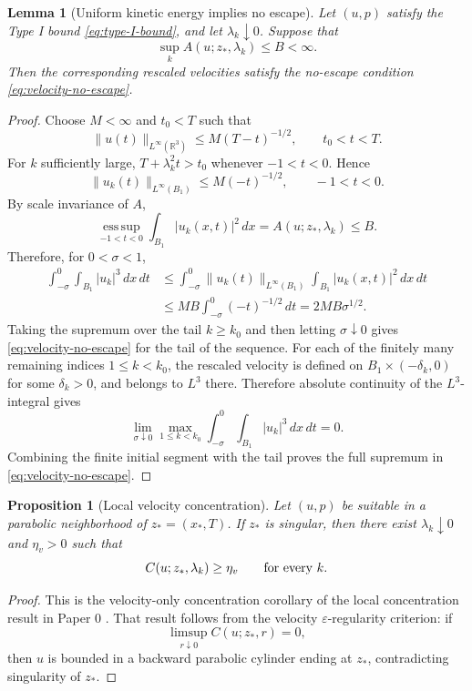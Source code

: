 \documentclass[11pt]{amsart}
\theoremstyle{plain}
\newtheorem{proposition}[theorem]{Proposition}
\newtheorem{lemma}[theorem]{Lemma}
\theoremstyle{definition}
\theoremstyle{remark}
\numberwithin{equation}{section}
\newcommand{\R}{\mathbb R}
\newcommand{\esssup}{\operatorname*{ess\,sup}}
\begin{document}
\begin{lemma}[Uniform kinetic energy implies no escape]
\label{lem:A-seq-no-escape}
Let \((u,p)\) satisfy the Type I bound \eqref{eq:type-I-bound}, and let
\(\lambda_k\downarrow0\).  Suppose that
\[
   \sup_k A(u;z_*,\lambda_k)\le B<\infty .
\]
Then the corresponding rescaled velocities satisfy the no-escape condition
\eqref{eq:velocity-no-escape}.
\end{lemma}

\begin{proof}
Choose \(M<\infty\) and \(t_0<T\) such that
\[
   \|u(t)\|_{L^\infty(\R^3)}
   \le M(T-t)^{-1/2},
   \qquad t_0<t<T.
\]
For \(k\) sufficiently large, \(T+\lambda_k^2t>t_0\) whenever
\(-1<t<0\).  Hence
\[
   \|u_k(t)\|_{L^\infty(B_1)}
   \le M(-t)^{-1/2},\qquad -1<t<0.
\]
By scale invariance of \(A\),
\[
   \esssup_{-1<t<0}\int_{B_1}|u_k(x,t)|^2\,dx
   =
   A(u;z_*,\lambda_k)\le B.
\]
Therefore, for \(0<\sigma<1\),
\[
\begin{aligned}
   \int_{-\sigma}^{0}\int_{B_1}|u_k|^3\,dx\,dt
   &\le
   \int_{-\sigma}^{0}
   \|u_k(t)\|_{L^\infty(B_1)}
   \int_{B_1}|u_k(x,t)|^2\,dx\,dt  \\
   &\le MB\int_{-\sigma}^{0}(-t)^{-1/2}\,dt
    =2MB\sigma^{1/2}.
\end{aligned}
\]
Taking the supremum over the tail \(k\ge k_0\) and then letting
\(\sigma\downarrow0\) gives \eqref{eq:velocity-no-escape} for the tail of the
sequence.  For each of the finitely many remaining indices
\(1\le k<k_0\), the rescaled velocity is defined on
\(B_1\times(-\delta_k,0)\) for some \(\delta_k>0\), and belongs to
\(L^3\) there.  Therefore absolute continuity of the \(L^3\)-integral gives
\[
   \lim_{\sigma\downarrow0}
   \max_{1\le k<k_0}
   \int_{-\sigma}^{0}\int_{B_1}|u_k|^3\,dx\,dt=0.
\]
Combining the finite initial segment with the tail proves the full supremum
in \eqref{eq:velocity-no-escape}.
\end{proof}

\begin{proposition}[Local velocity concentration]
\label{prop:local-velocity-concentration}
Let \((u,p)\) be suitable in a parabolic neighborhood of
\(z_*=(x_*,T)\).  If \(z_*\) is singular, then there exist
\(\lambda_k\downarrow0\) and \(\eta_v>0\) such that
\[
   C(u;z_*,\lambda_k)\ge\eta_v
   \qquad\hbox{for every }k.
\]
\end{proposition}

\begin{proof}
This is the velocity-only concentration corollary of the local concentration
result in Paper 0 \cite{DuranPaper0}.  That result follows from the
velocity \(\varepsilon\)-regularity criterion: if
\[
   \limsup_{r\downarrow0}C(u;z_*,r)=0,
\]
then \(u\) is bounded in a backward parabolic cylinder ending at \(z_*\),
contradicting singularity of \(z_*\).
\end{proof}
\end{document}

